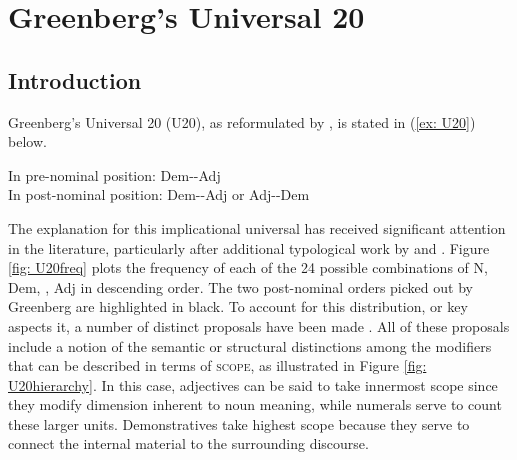 \documentclass[output=paper]{langsci/langscibook}
\begin{document}
\section{Greenberg's Universal 20}

\subsection{Introduction}

Greenberg's Universal 20 (U20), as reformulated by \cite{Cinque05}, is stated in (\ref{ex: U20}) below.

\begin{exe}
	\ex\label{ex: U20} In pre-nominal position: Dem--Adj
	\\
	In post-nominal position: Dem--Adj or Adj--Dem
\end{exe}

The explanation for this  implicational universal has received significant attention in the literature, particularly after additional typological work by \cite{Cinque05} and \cite{dryer2009order}. Figure \ref{fig: U20freq} plots the frequency of each of the 24 possible combinations of N, Dem, , Adj in descending order. The two post-nominal orders picked out by Greenberg are highlighted in black. To account for this distribution, or key aspects it, a number of distinct proposals have been made \citep[e.g.,][]{Cinque05, abels2012linear, dryer2009order, cysouw2010dealing,SteddySamekLodovici11}. All of these proposals include a notion of the semantic or structural distinctions among the modifiers that can be described in terms of \textsc{scope},  as illustrated in Figure \ref{fig: U20hierarchy}. In this case, adjectives can be said to take innermost scope since they modify dimension inherent to noun meaning, while numerals serve to count these larger units. Demonstratives take highest scope because they serve to connect the internal material to the surrounding discourse. 

\end{document}
